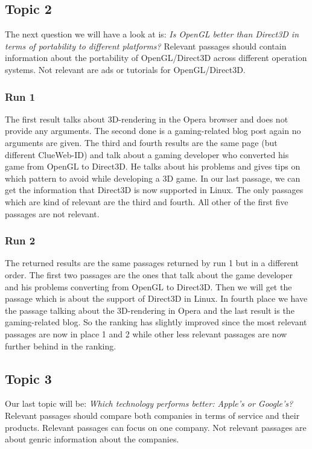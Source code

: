     \subsection{Topic 2}
        The next question we will have a look at is: \textit{Is OpenGL better than Direct3D in terms of portability to different platforms?} Relevant passages should contain information about the portability of OpenGL/Direct3D across different operation systems. Not relevant are ads or tutorials for OpenGL/Direct3D.
        \subsubsection*{Run 1}
            The first result talks about 3D-rendering in the Opera browser and does not provide any arguments. The second done is a gaming-related blog post again no arguments are given. The third and fourth results are the same page (but different ClueWeb-ID) and talk about a gaming developer who converted his game from OpenGL to Direct3D. He talks about his problems and gives tips on which pattern to avoid while developing a 3D game. In our last passage, we can get the information that Direct3D is now supported in Linux. The only passages which are kind of relevant are the third and fourth. All other of the first five passages are not relevant. 
        \subsubsection*{Run 2}
            The returned results are the same passages returned by run 1 but in a different order. The first two passages are the ones that talk about the game developer and his problems converting from OpenGL to Direct3D. Then we will get the passage which is about the support of Direct3D in Linux. In fourth place we have the passage talking about the 3D-rendering in Opera and the last result is the gaming-related blog. So the ranking has slightly improved since the most relevant passages are now in place 1 and 2 while other less relevant passages are now further behind in the ranking.
    \subsection{Topic 3}
        Our last topic will be: \textit{Which technology performs better: Apple's or Google's?} Relevant passages should compare both companies in terms of service and their products. Relevant passages can focus on one company. Not relevant passages are about genric information about the companies.
